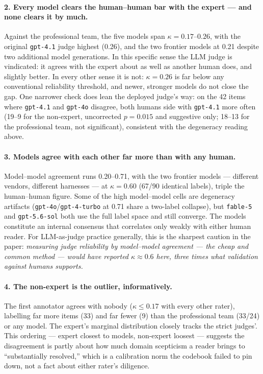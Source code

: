 \paragraph{2. Every model clears the human--human bar with the expert
--- and none clears it by much.} Against the professional team, the
five models span $\kappa=0.17$--$0.26$, with the original
\texttt{gpt-4.1} judge highest (0.26), and the two frontier models at
0.21 despite two additional model generations. In this specific sense
the LLM judge is vindicated: it agrees with the expert about as well as
another human does, and slightly better. In every other sense it is
not: $\kappa=0.26$ is far below any conventional reliability threshold,
and newer, stronger models do not close the gap. One narrower check
does lean the deployed judge's way: on the 42 items where
\texttt{gpt-4.1} and \texttt{gpt-4o} disagree, both humans side with
\texttt{gpt-4.1} more often (19--9 for the non-expert, uncorrected
$p=0.015$ and suggestive only; 18--13 for the professional team, not
significant), consistent with the degeneracy reading above.

\paragraph{3. Models agree with each other far more than with any
human.} Model--model agreement runs 0.20--0.71, with the two frontier
models --- different vendors, different harnesses --- at
$\kappa=0.60$ (67/90 identical labels), triple the human--human figure.
Some of the high model--model cells are degeneracy artifacts
(\texttt{gpt-4o}/\texttt{gpt-4-turbo} at 0.71 share a two-label
collapse), but \texttt{fable-5} and \texttt{gpt-5.6-sol} both use the
full label space and still converge. The models constitute an internal
consensus that correlates only weakly with either human reader. For
LLM-as-judge practice generally, this is the sharpest caution in the
paper: \emph{measuring judge reliability by model--model agreement ---
the cheap and common method --- would have reported
$\kappa\approx0.6$ here, three times what validation against humans
supports.}

\paragraph{4. The non-expert is the outlier, informatively.} The first
annotator agrees with nobody ($\kappa\leq0.17$ with every other rater),
labelling far more items  (33) and far fewer
 (9) than the professional team (33/24) or any
model. The expert's marginal distribution closely tracks the strict
judges'. This ordering --- expert closest to models, non-expert
loosest --- suggests the disagreement is partly about how much domain
scepticism a reader brings to ``substantially resolved,'' which is a
calibration norm the codebook failed to pin down, not a fact about
either rater's diligence.

